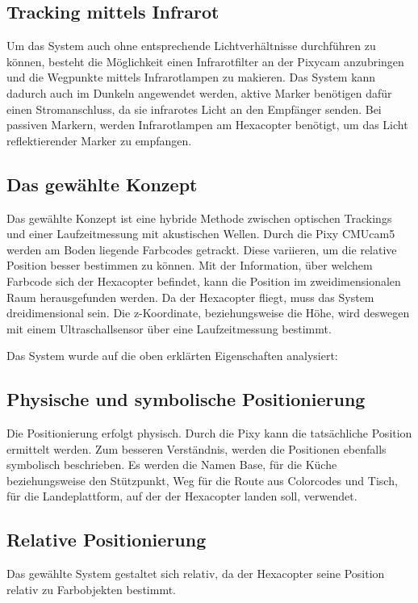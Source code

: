   \subsection*{Tracking mittels Infrarot}
  Um das System auch ohne entsprechende Lichtverhältnisse durchführen zu können, besteht die Möglichkeit einen Infrarotfilter an der Pixycam anzubringen und die Wegpunkte mittels Infrarotlampen zu makieren. Das System kann dadurch auch im Dunkeln angewendet werden, aktive Marker benötigen dafür einen Stromanschluss, da sie infrarotes Licht an den Empfänger senden. Bei passiven Markern, werden Infrarotlampen am Hexacopter benötigt, um das Licht reflektierender Marker zu empfangen.

  \subsection{Das gewählte Konzept}
  Das gewählte Konzept ist eine hybride Methode zwischen optischen Trackings und einer Laufzeitmessung mit akustischen Wellen.
  Durch die Pixy CMUcam5 werden am Boden liegende Farbcodes getrackt. Diese variieren, um die relative Position besser bestimmen zu können. Mit der Information, über welchem Farbcode sich der Hexacopter befindet, kann die Position im zweidimensionalen Raum herausgefunden werden. Da der Hexacopter fliegt, muss das System dreidimensional sein. Die z-Koordinate, beziehungsweise die Höhe, wird deswegen mit einem Ultraschallsensor über eine Laufzeitmessung bestimmt.

  Das System wurde auf die oben erklärten Eigenschaften analysiert:

  \subsection*{Physische und symbolische Positionierung}
  Die Positionierung erfolgt physisch. Durch die Pixy kann die tatsächliche Position ermittelt werden.
  Zum besseren Verständnis, werden die Positionen ebenfalls symbolisch beschrieben. Es werden die Namen Base, für die Küche beziehungsweise den Stützpunkt, Weg für die Route aus Colorcodes und Tisch, für die Landeplattform, auf der der Hexacopter landen soll, verwendet.

  \subsection*{Relative Positionierung}
  Das gewählte System gestaltet sich relativ, da der Hexacopter seine Position relativ zu Farbobjekten bestimmt.

